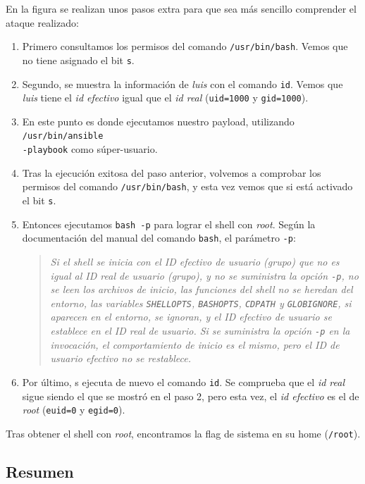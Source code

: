En la figura se realizan unos pasos extra para que sea más sencillo comprender el ataque realizado:
\begin{enumerate}
    \item Primero consultamos los permisos del comando \texttt{/usr/bin/bash}. Vemos que no tiene asignado el bit \texttt{s}.
    \item Segundo, se muestra la información de \textit{luis} con el comando \texttt{id}. Vemos que \textit{luis} tiene el \textit{id efectivo} igual que el \textit{id real} (\texttt{uid=1000} y \texttt{gid=1000}).
    \item En este punto es donde ejecutamos nuestro payload, utilizando \texttt{/usr/bin/ansible\\-playbook} como súper-usuario.
    \item Tras la ejecución exitosa del paso anterior, volvemos a comprobar los permisos del comando \texttt{/usr/bin/bash}, y esta vez vemos que si está activado el bit \texttt{s}.
    \item Entonces ejecutamos \texttt{bash -p} para lograr el shell con \textit{root}. Según la documentación del manual del comando \texttt{bash}\cite{bash-man}, el parámetro \texttt{-p}:
          \begin{quote}
              \textit{Si el shell se inicia con el ID efectivo de usuario (grupo) que no es igual al ID real de usuario (grupo), y no se suministra la opción \texttt{-p}, no se leen los archivos de inicio, las funciones del shell no se heredan del entorno, las variables \texttt{SHELLOPTS}, \texttt{BASHOPTS}, \texttt{CDPATH} y \texttt{GLOBIGNORE}, si aparecen en el entorno, se ignoran, y el ID efectivo de usuario se establece en el ID real de usuario.  Si se suministra la opción \texttt{-p} en la invocación, el comportamiento de inicio es el mismo, pero el ID de usuario efectivo no se restablece.}
          \end{quote}
    \item Por último, s ejecuta de nuevo el comando \texttt{id}. Se comprueba que el \textit{id real} sigue siendo el que se mostró en el paso 2, pero esta vez, el \textit{id efectivo} es el de \textit{root} (\texttt{euid=0} y \texttt{egid=0}).
\end{enumerate}

Tras obtener el shell con \textit{root}, encontramos la flag de sistema en su home (\texttt{/root}).

\subsection{Resumen}

